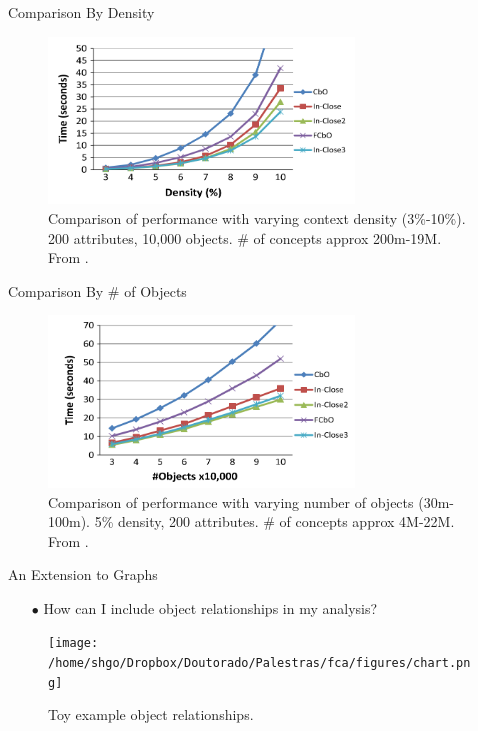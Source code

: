 \documentclass[pdf,xcolor=table]{beamer}
\begin{document}
\begin{frame}[c]{Comparison By Density}
    \begin{figure}
        \centering
        \includegraphics[width=230pt]{andrews_2.png}
        \caption{Comparison of performance with varying context density (3\%-10\%). 200 attributes, 10,000 objects. \# of concepts approx 200m-19M.
        From \cite{Andrews2015}.}
    \end{figure}
\end{frame}

\begin{frame}[c]{Comparison By \# of Objects}
    \begin{figure}
        \centering
        \includegraphics[width=230pt]{andrews_3.png}
        \caption{Comparison of performance with varying number of objects (30m-100m). 5\% density, 200 attributes.
        \# of concepts approx 4M-22M.
        From \cite{Andrews2015}.}
    \end{figure}
\end{frame}


\begin{frame}[t]{An Extension to Graphs}
    \begin{itemize}
        \item[$\bullet$] How can I include object relationships in my analysis?
    \end{itemize}
    \begin{figure}[h]
        \texttt{[image: /home/shgo/Dropbox/Doutorado/Palestras/fca/figures/chart.png]}
        \caption{Toy example object relationships.}
    \end{figure}
\end{frame}
\end{document}
